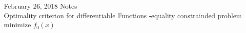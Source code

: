 \documentclass[11pt]{article}
\begin{document}
February 26, 2018 Notes\\
Optimality criterion for differentiable Functions
-equality constrainded problem\\
minimize $f_{0}(x)$
\end{document}
